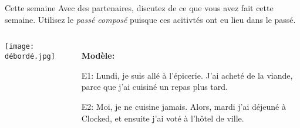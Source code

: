 \begin{frame}{Cette semaine}
  Avec des partenaires, discutez de ce que vous avez fait cette semaine.
  Utilisez le \emph{passé composé} puisque ces acitivtés ont eu lieu dans le passé.
  \begin{columns}
      \begin{center}
        \texttt{[image: débordé.jpg]}
      \end{center}
      \begin{itemize}
        \item[] \textbf{Modèle:}
        \item[E1:] Lundi, je suis allé à l'épicerie. J'ai acheté de la viande, parce que j'ai cuisiné un repas plus tard.
        \item[E2:] Moi, je ne cuisine jamais. Alors, mardi j'ai déjeuné à Clocked, et ensuite j'ai voté à l'hôtel de ville.
      \end{itemize}
  \end{columns}
\end{frame}